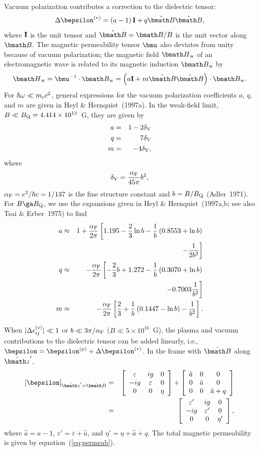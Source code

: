 \documentclass{mn2e}
\newcommand{\be}{\begin{equation}}
\newcommand{\ee}{\end{equation}}
\newcommand{\ba}{\begin{eqnarray}}
\newcommand{\ea}{\end{eqnarray}}
\newcommand{\lp}{\left(}
\newcommand{\rp}{\right)}
\newcommand{\lb}{\left[}
\newcommand{\rb}{\right]}
\newcommand{\me}{m_{\rm e}}
\newcommand{\alphaf}{\alpha_{\rm F}}
\newcommand{\vecB}{{\bmath B}}
\newcommand{\vechatB}{\hat{\bmath B}}
\newcommand{\vechatzp}{\hat{\bmath z}'}
\newcommand{\Bq}{B_{\rm Q}}
\newcommand{\vecone}{{\bf I}}
\newcommand{\veceps}{{\bepsilon}}
\newcommand{\vecepspl}{\bepsilon^{\rm (p)}}
\newcommand{\vecepsvp}{\Delta\bepsilon^{\rm (v)}}
\newcommand{\epsvp}{\Delta\epsilon^{\rm (v)}}
\newcommand{\vpa}{a}
\newcommand{\vpatwo}{\hat{a}}
\newcommand{\vpq}{q}
\newcommand{\vpm}{m}
\newcommand{\vecBw}{{\bmath B}_{\rm w}}
\newcommand{\vecHw}{{\bmath H}_{\rm w}}
\newcommand{\deltavp}{\delta_{\rm V}}
\begin{document}
Vacuum polarization contributes a correction to the dielectric tensor:
\be
\vecepsvp = \lp\vpa - 1\rp\vecone + \vpq\vechatB\vechatB,
\ee
where $\vecone$ is the unit tensor and
$\vechatB=\vecB/B$ is the unit vector along $\vecB$.
The magnetic permeability tensor $\bmu$ also deviates from unity
because of vacuum polarization; the magnetic field $\vecHw$
of an electromagnetic wave is related to its magnetic induction
$\vecBw$ by
\be
\vecHw=\bmu^{-1}\cdot\vecBw=\lp\vpa\vecone+\vpm\vechatB\vechatB\rp\cdot\vecBw.
 \label{eq:permeab}
\ee
For $\hbar\omega\ll\me c^2$, general expressions for the vacuum
polarization coefficients $\vpa$, $\vpq$, and $\vpm$ are given
in Heyl \& Hernquist~(1997a).
In the weak-field limit, $B\ll\Bq=4.414\times 10^{13}$~G,
they are given by
\ba
\vpa & = & 1-2\deltavp \label{eq:vpalo} \\
\vpq & = & 7\deltavp \label{eq:vpqlo} \\
\vpm & = & -4\deltavp, \label{eq:vpmlo}
\ea
where
\be
\deltavp = \frac{\alphaf}{45\pi}b^2, \label{eq:deltavp}
\ee
$\alphaf=e^2/\hbar c=1/137$ is the fine structure constant and
$b = B/\Bq$ (Adler~1971).
For $B\ga\Bq$, we use the expansions given in Heyl \& Hernquist~(1997a,b;
see also Tsai \& Erber~1975) to find
\ba
\vpa & \approx & 1+\frac{\alphaf}{2\pi}\lb 1.195-\frac{2}{3}\ln b
 -\frac{1}{b}\lp 0.8553+\ln b\rp \right. \nonumber \\
 && \qquad \qquad \left. -\frac{1}{2b^2}\rb \label{eq:vpahi} \\
\vpq & \approx & -\frac{\alphaf}{2\pi} \lb
 -\frac{2}{3}b + 1.272 - \frac{1}{b}\lp 0.3070+\ln b\rp \right. \nonumber \\
 && \qquad \qquad \left. -0.7003\frac{1}{b^2}\rb \label{eq:vpqhi} \\
\vpm & \approx & -\frac{\alphaf}{2\pi} \lb\frac{2}{3}+\frac{1}{b}\lp 0.1447-\ln b\rp
 -\frac{1}{b^2}\rb.  \label{eq:vpmhi}
\ea

When $|\epsvp_{ij}|\ll 1$ or $b\ll 3\pi/\alphaf$
($B\ll 5\times10^{16}$~G), the plasma and vacuum contributions to
the dielectric tensor can be added linearly, i.e.,
$\veceps=\vecepspl+\vecepsvp$.
In the frame with $\vechatB$ along $\vechatzp$,
\ba
\lb\veceps\rb_{\vechatzp=\vechatB} & = & \lb \begin{array}{ccc}
\varepsilon & ig & 0 \\
-ig & \varepsilon & 0 \\
0 & 0 & \eta
\end{array} \rb
+ \lb \begin{array}{ccc}
\vpatwo & 0 & 0 \\
0 & \vpatwo & 0 \\
0 & 0 & \vpatwo+\vpq
\end{array} \rb \nonumber \\
 & = & \lb \begin{array}{ccc}
\varepsilon' & ig & 0 \\
-ig & \varepsilon' & 0 \\
0 & 0 & \eta'
\end{array} \rb, \label{eq:epsij}
\ea
where $\vpatwo=\vpa-1$, $\varepsilon'=\varepsilon+\vpatwo$, and
$\eta'=\eta+\vpatwo+\vpq$.  The total magnetic permeability
is given by equation~(\ref{eq:permeab}).
\end{document}
